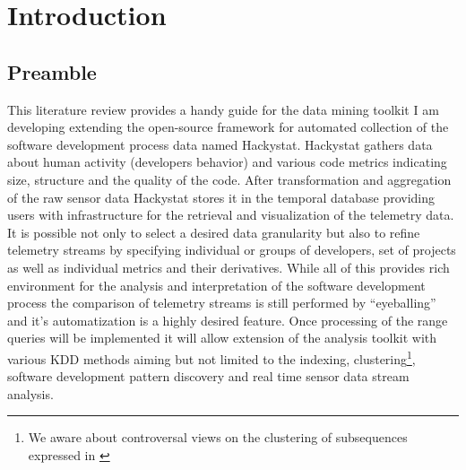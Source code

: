 \chapter{Introduction}
\section{Preamble}
This literature review provides a handy guide for the data mining toolkit I am developing extending the open-source framework for automated collection of the software development process data named Hackystat. Hackystat gathers data about human activity (developers behavior) and various code metrics indicating size, structure and the quality of the code. After transformation and aggregation of the raw sensor data Hackystat stores it in the temporal database providing users with infrastructure for the retrieval and visualization of the telemetry data. It is possible not only to select a desired data granularity but also to refine telemetry streams by specifying individual or groups of developers, set of projects as well as individual metrics and their derivatives. While all of this provides rich environment for the analysis and interpretation of the software development process the comparison of telemetry streams is still performed by ``eyeballing'' and it's automatization is a highly desired feature. Once processing of the range queries will be implemented it will allow extension of the analysis toolkit with various KDD methods aiming but not limited to the indexing, clustering\footnote{We aware about controversal views on the clustering of subsequences expressed in \cite{citeulike:227029}}, software development pattern discovery and real time sensor data stream analysis.


